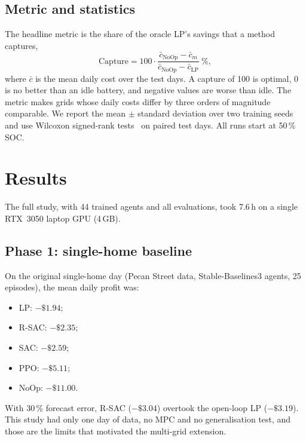 \documentclass[conference]{IEEEtran}
\begin{document}
\subsection{Metric and statistics}
The headline metric is the share of the oracle LP's savings that a method
captures,
\begin{equation}
\mathrm{Capture} = 100\cdot\frac{\bar c_{\mathrm{NoOp}}-\bar c_{m}}{\bar c_{\mathrm{NoOp}}-\bar c_{\mathrm{LP}}}\ \% ,
\end{equation}
where $\bar c$ is the mean daily cost over the test days. A capture of 100 is
optimal, 0 is no better than an idle battery, and negative values are worse than
idle. The metric makes grids whose daily costs differ by three orders of
magnitude comparable. We report the mean $\pm$ standard deviation over two
training seeds and use Wilcoxon signed-rank tests~\cite{wilcoxon1945} on paired
test days. All runs start at 50\,\% SOC.

\section{Results}

The full study, with 44 trained agents and all evaluations, took 7.6\,h on a single RTX~3050
laptop GPU (4\,GB).

\subsection{Phase 1: single-home baseline}
On the original single-home day (Pecan Street data, Stable-Baselines3 agents,
25 episodes), the mean daily profit was:
\begin{itemize}
\item LP: $-\$1.94$;
\item R-SAC: $-\$2.35$;
\item SAC: $-\$2.59$;
\item PPO: $-\$5.11$;
\item NoOp: $-\$11.00$.
\end{itemize}
With 30\,\% forecast error, R-SAC ($-\$3.04$) overtook the open-loop LP ($-\$3.19$).
This study had only one day of data, no MPC and no generalisation test, and those
are the limits that motivated the multi-grid extension.
\end{document}
